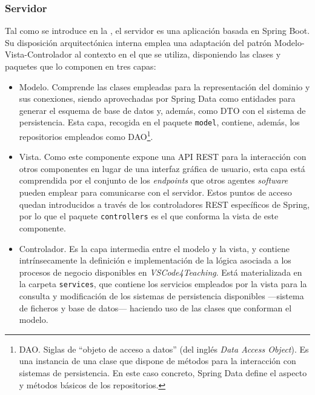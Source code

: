 \subsubsection{Servidor}
\label{subsec:diseñoServidor}
Tal como se introduce en la , el servidor es una aplicación basada en Spring Boot. Su disposición arquitectónica interna emplea una adaptación del patrón Modelo-Vista-Controlador al contexto en el que se utiliza, disponiendo las clases y paquetes que lo componen en tres capas:
\begin{itemize}
    \item Modelo. Comprende las clases empleadas para la representación del dominio y sus conexiones, siendo aprovechadas por Spring Data como entidades para generar el esquema de base de datos y, además, como DTO con el sistema de persistencia. Esta capa, recogida en el paquete \texttt{model}, contiene, además, los repositorios empleados como DAO\footnote{DAO. Siglas de ``objeto de acceso a datos'' (del inglés \textit{Data Access Object}). Es una instancia de una clase que dispone de métodos para la interacción con sistemas de persistencia. En este caso concreto, Spring Data define el aspecto y métodos básicos de los repositorios.}.
    \item Vista. Como este componente expone una API REST para la interacción con otros componentes en lugar de una interfaz gráfica de usuario, esta capa está comprendida por el conjunto de los \textit{endpoints} que otros agentes \textit{software} pueden emplear para comunicarse con el servidor. Estos puntos de acceso quedan introducidos a través de los controladores REST específicos de Spring, por lo que el paquete \texttt{controllers} es el que conforma la vista de este componente.
    \item Controlador. Es la capa intermedia entre el modelo y la vista, y contiene intrínsecamente la definición e implementación de la lógica asociada a los procesos de negocio disponibles en \textit{VSCode4Teaching}. Está materializada en la carpeta \texttt{services}, que contiene los servicios empleados por la vista para la consulta y modificación de los sistemas de persistencia disponibles ---sistema de ficheros y base de datos--- haciendo uso de las clases que conforman el modelo.
\end{itemize}

